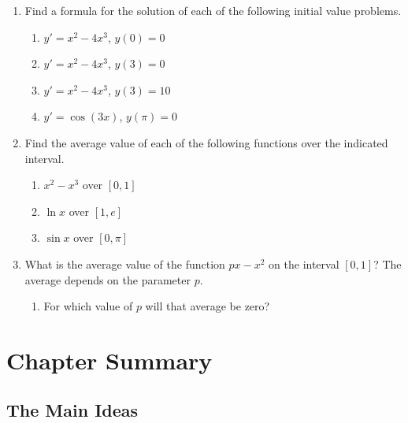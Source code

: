 \begin{enumerate}
\begin{enumerate}
  \item ${\displaystyle \int_1^2 u^c \, du}$
\mbox{}




\end{enumerate}
\item Find a formula for the solution of each of the following initial
value problems.



  \begin{enumerate}
  \item $y' = x^2 - 4x^3$, \quad $y(0) = 0$


  \item $y' = x^2 - 4x^3$, \quad $y(3) = 0$


  \item $y' = x^2 - 4x^3$, \quad $y(3) = 10$


  \item $y' = \cos(3x)$, \quad $y(\pi) = 0$
\mbox{}



\end{enumerate}
\item Find the average value of each of the following functions over
the indicated interval.

  \begin{enumerate}
  \item $x^2 - x^3$ over $[0, 1]$


  \item $\ln{x}$ over $[1, e]$


  \item $\sin{x}$ over $[0, \pi]$



\end{enumerate}
\item What is the average value of the function $px - x^2$ on the
interval $[0, 1]$?  The average depends on the parameter $p$.

  \begin{enumerate}
  \item For which value of $p$ will that average be zero?

\end{enumerate}
\end{enumerate}
\section{Chapter Summary}
\label{sec:chapter-summary}


\subsection{The Main Ideas}
\label{subsec:the-main-ideas}

